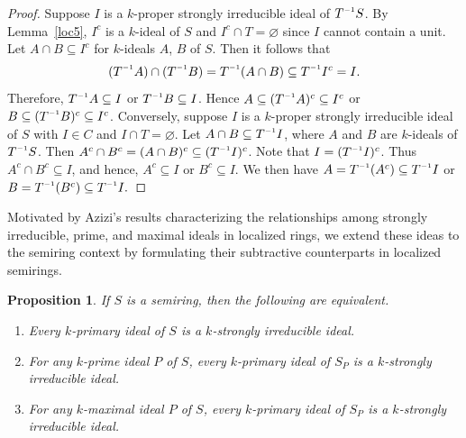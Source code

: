 \documentclass[11pt,leqno]{amsart}
\newcommand{\inv}{^{\raisebox{.2ex}{$\scriptscriptstyle-1$}}}
\newtheorem{proposition}[theorem]{Proposition}
\theoremstyle{definition}
\numberwithin{equation}{section}
\begin{document}
\begin{proof}
    Suppose $I$ is a  $k$-proper strongly irreducible ideal of $T\inv S$. By Lemma~\ref{loc5}, $I^c$ is a $k$-ideal of $S$ and $I^c \cap T=\varnothing $ since $I$ cannot contain a unit. Let $A \cap B \subseteq I^c$ for $k$-ideals $A$, $B$ of $S$. Then it follows that \[(T\inv A) \cap (T\inv B) =T\inv (A\cap B) \subseteq T\inv I^c =I.\] Therefore, $T\inv A \subseteq I$ or $T\inv B \subseteq I$. Hence $A\subseteq (T\inv A)^c \subseteq I^c$ or $B\subseteq (T\inv B)^c \subseteq I^c$. 
    Conversely, suppose $I$ is a $k$-proper strongly irreducible ideal of $S$ with $I\in C$ and $I \cap T =\varnothing $.  Let $A \cap B \subseteq T\inv I$, where $A$ and $B$ are $k$-ideals of $T\inv S$. Then $A^c \cap B^c =(A \cap B)^c \subseteq (T\inv I)^c$. Note that $I=(T\inv I)^c $. Thus $A^c \cap B^c \subseteq I$, and hence, $A^c \subseteq I$ or $B^c \subseteq I$. We then have $A=T\inv (A^c) \subseteq  T\inv I$ or $B=T\inv(B^c) \subseteq T\inv I.$
\end{proof}

Motivated by Azizi's results \cite[Theorem 3.4]{Azizi08} characterizing the relationships among strongly irreducible, prime, and maximal ideals in localized rings, we extend these ideas to the semiring context by formulating their subtractive counterparts in localized semirings.

\begin{proposition}
 If $S$ is a semiring, then the following are equivalent.
\begin{enumerate}
\item  Every $k$-primary ideal of $S$ is a $k$-strongly irreducible ideal.

\item For any $k$-prime ideal $P$ of $S$, every $k$-primary ideal of $S_P$ is a $k$-strongly irreducible
ideal.

\item For any $k$-maximal ideal $P$ of $S$, every $k$-primary ideal of $S_P$ is a $k$-strongly irreducible
ideal.
\end{enumerate}
\end{proposition}
\end{document}
